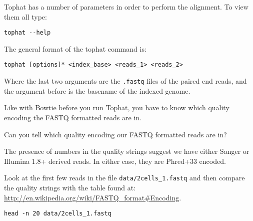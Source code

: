 \begin{steps}
Tophat has a number of parameters in order to perform the alignment. To view them all type:
\begin{lstlisting}
tophat --help
\end{lstlisting}
\end{steps}

\begin{information}
The general format of the tophat command is:
\begin{lstlisting}
tophat [options]* <index_base> <reads_1> <reads_2>
\end{lstlisting}

Where the last two arguments are the \texttt{.fastq} files of the paired end reads, and the argument
before is the basename of the indexed genome.
\end{information}

\begin{note}
Like with Bowtie before you run Tophat, you have to know which quality encoding the FASTQ
formatted reads are in.
\end{note}

\begin{questions}
Can you tell which quality encoding our FASTQ formatted reads are in?
\begin{answer}
The presence of numbers in the quality strings suggest we have either Sanger or
Illumina 1.8+ derived reads. In either case, they are Phred+33 encoded.
\end{answer}

\begin{information}
Look at the first few reads in the file \texttt{data/2cells\_1.fastq} and
then compare the quality strings with the table found at:
\url{http://en.wikipedia.org/wiki/FASTQ_format#Encoding}. 
\begin{lstlisting}
head -n 20 data/2cells_1.fastq
\end{lstlisting}
\end{information}
\end{questions}

